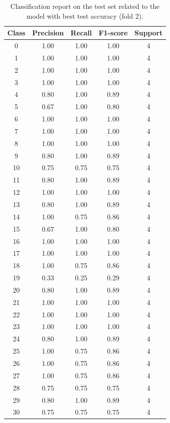 \documentclass{article}
\begin{document}
\begin{sloppy}
\begin{table}[ht]
  \centering
  \caption{Classification report on the test set related to the model with best test accuracy (fold 2).}
  \label{tab:test_report}
  \begin{tabular}{|c|c|c|c|c|}
  \hline
  Class & Precision & Recall & F1-score & Support \\
  \hline
  0  & 1.00 & 1.00 & 1.00 & 4 \\
  1  & 1.00 & 1.00 & 1.00 & 4 \\
  2  & 1.00 & 1.00 & 1.00 & 4 \\
  3  & 1.00 & 1.00 & 1.00 & 4 \\
  4  & 0.80 & 1.00 & 0.89 & 4 \\
  5  & 0.67 & 1.00 & 0.80 & 4 \\
  6  & 1.00 & 1.00 & 1.00 & 4 \\
  7  & 1.00 & 1.00 & 1.00 & 4 \\
  8  & 1.00 & 1.00 & 1.00 & 4 \\
  9  & 0.80 & 1.00 & 0.89 & 4 \\
  10 & 0.75 & 0.75 & 0.75 & 4 \\
  11 & 0.80 & 1.00 & 0.89 & 4 \\
  12 & 1.00 & 1.00 & 1.00 & 4 \\
  13 & 0.80 & 1.00 & 0.89 & 4 \\
  14 & 1.00 & 0.75 & 0.86 & 4 \\
  15 & 0.67 & 1.00 & 0.80 & 4 \\
  16 & 1.00 & 1.00 & 1.00 & 4 \\
  17 & 1.00 & 1.00 & 1.00 & 4 \\
  18 & 1.00 & 0.75 & 0.86 & 4 \\
  19 & 0.33 & 0.25 & 0.29 & 4 \\
  20 & 0.80 & 1.00 & 0.89 & 4 \\
  21 & 1.00 & 1.00 & 1.00 & 4 \\
  22 & 1.00 & 1.00 & 1.00 & 4 \\
  23 & 1.00 & 1.00 & 1.00 & 4 \\
  24 & 0.80 & 1.00 & 0.89 & 4 \\
  25 & 1.00 & 0.75 & 0.86 & 4 \\
  26 & 1.00 & 0.75 & 0.86 & 4 \\
  27 & 1.00 & 0.75 & 0.86 & 4 \\
  28 & 0.75 & 0.75 & 0.75 & 4 \\
  29 & 0.80 & 1.00 & 0.89 & 4 \\
  30 & 0.75 & 0.75 & 0.75 & 4 \\

\end{tabular}
\end{table}
\end{sloppy}
\end{document}
